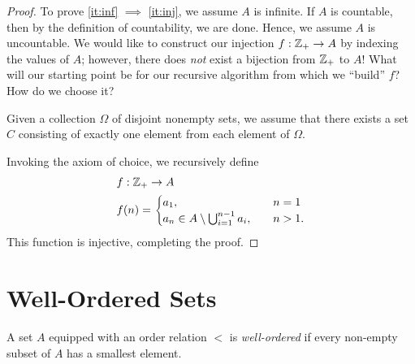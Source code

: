 \begin{proof}
	To prove \cref{it:inf} $\implies$ \cref{it:inj}, we assume $A$ is infinite.
	If $A$ is countable, then by the definition of countability, we are done.
	Hence, we assume $A$ is uncountable. We would like to construct our injection
	$f: \mathbb{Z}_{+} \to A$ by indexing the values of $A$; however, there does
	\emph{not} exist a bijection from $\mathbb{Z}_{+}$ to $A$! What will our starting
	point be for our recursive algorithm from which we ``build'' $f$? How do we
	choose it?
	\begin{remark}
		Given a collection $\Omega$ of disjoint nonempty sets, we assume that there exists a set $C$ consisting of exactly one element from each element of $\Omega$.	
	\end{remark} Invoking the axiom of choice, we recursively define
	\begin{equation*}
		\begin{split}
			& f: \mathbb{Z}_{+} \to A \\
			& f(n) = \begin{cases}
				a_{1}, & \quad n = 1 \\
				a_{n} \in A \setminus
			\bigcup_{i=1}^{n-1} a_{i}, & \quad n > 1.\end{cases}
		\end{split}
	\end{equation*}
	This function is injective, completing the proof.
\end{proof}
\section{Well-Ordered Sets}
\begin{definition}
	A set $A$ equipped with an order relation $<$ is \emph{well-ordered}
	if every non-empty subset of $A$ has a smallest element.
	\label{def:well-ordered}
\end{definition} 


